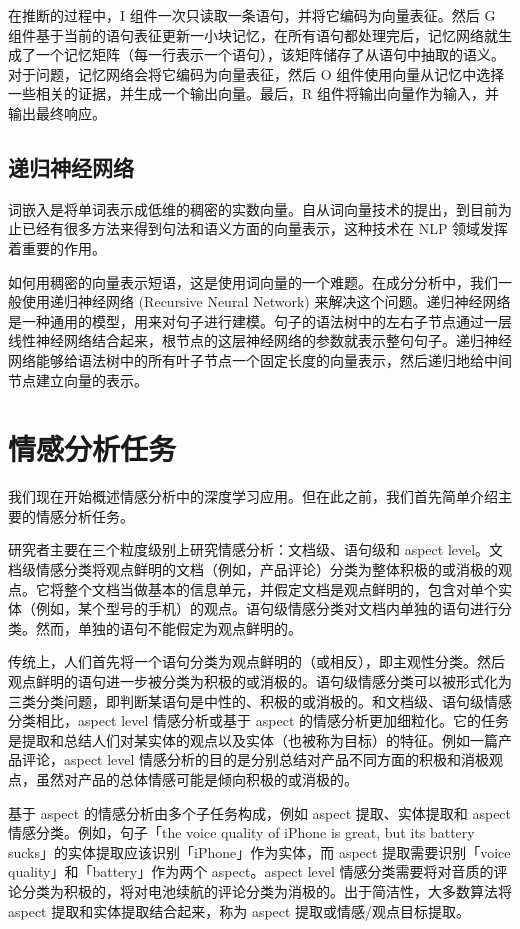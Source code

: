 \documentclass[lang=cn,11pt,a4paper]{elegantpaper}
\begin{document}
在推断的过程中，I 组件一次只读取一条语句，并将它编码为向量表征。然后 G 组件基于当前的语句表征更新一小块记忆，在所有语句都处理完后，记忆网络就生成了一个记忆矩阵（每一行表示一个语句），该矩阵储存了从语句中抽取的语义。对于问题，记忆网络会将它编码为向量表征，然后 O 组件使用向量从记忆中选择一些相关的证据，并生成一个输出向量。最后，R 组件将输出向量作为输入，并输出最终响应。
\subsection{递归神经网络}
词嵌入是将单词表示成低维的稠密的实数向量。自从词向量技术的提出，到目前为止已经有很多方法来得到句法和语义方面的向量表示，这种技术在 NLP 领域发挥着重要的作用。

如何用稠密的向量表示短语，这是使用词向量的一个难题。在成分分析中，我们一般使用递归神经网络 (Recursive Neural Network) 来解决这个问题。递归神经网络是一种通用的模型，用来对句子进行建模\cite{11}。句子的语法树中的左右子节点通过一层线性神经网络结合起来，根节点的这层神经网络的参数就表示整句句子。递归神经网络能够给语法树中的所有叶子节点一个固定长度的向量表示，然后递归地给中间节点建立向量的表示。

\section{情感分析任务}
我们现在开始概述情感分析中的深度学习应用。但在此之前，我们首先简单介绍主要的情感分析任务。

研究者主要在三个粒度级别上研究情感分析：文档级、语句级和 aspect level。文档级情感分类将观点鲜明的文档（例如，产品评论）分类为整体积极的或消极的观点。它将整个文档当做基本的信息单元，并假定文档是观点鲜明的，包含对单个实体（例如，某个型号的手机）的观点。语句级情感分类对文档内单独的语句进行分类。然而，单独的语句不能假定为观点鲜明的。

传统上，人们首先将一个语句分类为观点鲜明的（或相反），即主观性分类。然后观点鲜明的语句进一步被分类为积极的或消极的。语句级情感分类可以被形式化为三类分类问题，即判断某语句是中性的、积极的或消极的。和文档级、语句级情感分类相比，aspect level 情感分析或基于 aspect 的情感分析更加细粒化。它的任务是提取和总结人们对某实体的观点以及实体（也被称为目标）的特征。例如一篇产品评论，aspect level 情感分析的目的是分别总结对产品不同方面的积极和消极观点，虽然对产品的总体情感可能是倾向积极的或消极的。

基于 aspect 的情感分析由多个子任务构成，例如 aspect 提取、实体提取和 aspect 情感分类。例如，句子「the voice quality of iPhone is great, but its battery sucks」的实体提取应该识别「iPhone」作为实体，而 aspect 提取需要识别「voice quality」和「battery」作为两个 aspect。aspect level 情感分类需要将对音质的评论分类为积极的，将对电池续航的评论分类为消极的。出于简洁性，大多数算法将 aspect 提取和实体提取结合起来，称为 aspect 提取或情感/观点目标提取。
\end{document}
